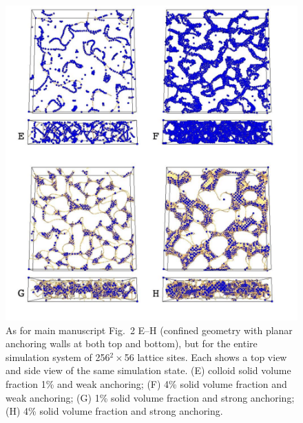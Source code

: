 \documentclass[12pt,twoside]{article}
\begin{document}
\begin{figure}[!h]
\begin{center}
\includegraphics[scale=0.42]{support-fig6.pdf}
\end{center}
\caption{As for main manuscript Fig.~2 E--H (confined geometry with planar
anchoring walls at both top and bottom), but for the entire simulation
system of 256$^2\times$56 lattice sites. Each shows a top view and
side view of the same simulation state. (E) colloid solid volume fraction 1\%
and weak anchoring; (F) 4\% solid volume fraction and weak anchoring;
(G) 1\% solid volume fraction and strong anchoring; (H) 4\% solid
volume fraction and strong anchoring.}
\end{figure}

\newpage
\end{document}
